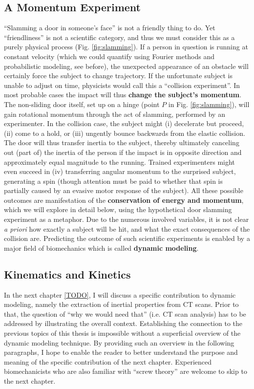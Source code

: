 \documentclass[10pt,a4paper]{article}
\begin{document}
\subsection{A Momentum Experiment}
\label{sec:org481d809}
``Slamming a door in someone's face'' is not a friendly thing to do.
Yet ``friendliness'' is not a scientific category, and thus we must consider this as a purely physical process (Fig. \ref{fig:slamming}).
If a person in question is running at constant velocity (which we could quantify using Fourier methods and probabilistic modeling, see before), the unexpected appearance of an obstacle will certainly force the subject to change trajectory.
If the unfortunate subject is unable to adjust on time, physicists would call this a ``collision experiment''.
In most probable cases the impact will thus \textbf{change the subject's momentum}.
The non-sliding door itself, set up on a hinge (point \(P\) in Fig. \ref{fig:slamming}), will gain rotational momentum through the act of slamming, performed by an experimenter.
In the collision case, the subject might (i) decelerate but proceed, (ii) come to a hold, or (iii) ungently bounce backwards from the elastic collision.
The door will thus transfer inertia to the subject, thereby ultimately canceling out (part of) the inertia of the person if the impact is in opposite direction and approximately equal magnitude to the running.
Trained experimenters might even succeed in (iv) transferring angular momentum to the surprised subject, generating a spin (though attention must be paid to whether that spin is partially caused by an evasive motor response of the subject).
All these possible outcomes are manifestation of the \textbf{conservation of energy and momentum}, which we will explore in detail below, using the hypothetical door slamming experiment as a metaphor.
Due to the numerous involved variables, it is not clear \emph{a priori} how exactly a subject will be hit, and what the exact consequences of the collision are.
Predicting the outcome of such scientific experiments is enabled by a major field of biomechanics which is called \textbf{dynamic modeling}.


\subsection{Kinematics and Kinetics}
\label{sec:org99d2ae0}
In the next chapter \ref{TODO}, I will discuss a specific contribution to dynamic modeling, namely the extraction of inertial properties from CT scans.
Prior to that, the question of ``why we would need that'' (i.e. CT scan analysis) has to be addressed by illustrating the overall context.
Establishing the connection to the previous topics of this thesis is impossible without a superficial overview of the dynamic modeling technique.
By providing such an overview in the following paragraphs, I hope to enable the reader to better understand the purpose and meaning of the specific contribution of the next chapter.
Experienced biomechanicists who are also familiar with ``screw theory'' are welcome to skip to the next chapter.
\end{document}
